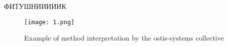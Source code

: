 
ФИТУШНИИИИИК 
\usepackage{graphicx}
\usepackage{multicol}
\usepackage{amsmath}
\usepackage{amssymb}
\usepackage[left=20mm, top=17mm, right=16mm, bottom=18mm, ]{geometry}
\usepackage{enumitem}
\usepackage{fancyhdr}
\usepackage[russian]{babel}
\setlength{\columnsep}{0.5cm}
\graphicspath{{files/}}
\pagestyle{fancy}
\fancyhf{}
\renewcommand{\headrulewidth}{0pt}
\fancyfoot[C]{\textbf{\thepage}}

\setcounter{page}{27}
\usepackage{setspace}
\linespread{0.3}


\setcounter{figure}{2}

\begin{figure}
    \centering
   
\texttt{[image: 1.png]}

    \caption{ Example of method interpretation by the ostis-systems collective}
    
  
    \end{figure}
\setlength{\parskip}{0pt}%
